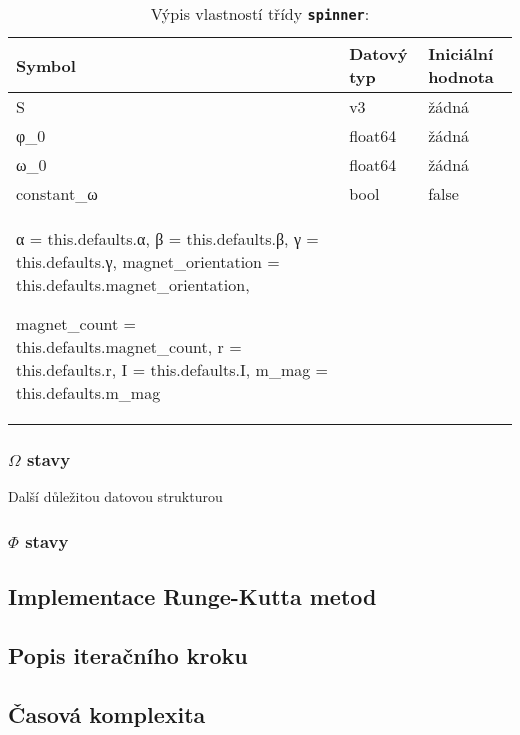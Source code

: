 \documentclass[12pt, a4paper,
 twoside,        %
 openright
]{report}
\begin{document}
\begin{table}[!ht]
    \captionsetup{justification=raggedright,singlelinecheck=off}
    \caption[Výpis vlastností třídy \textbf{\texttt{spinner}}]{Výpis vlastností třídy \textbf{\texttt{spinner}}:}
    \label{tab:sim_spinner_properties}

    \begin{tabularx}{\textwidth}{p{} p{} p{}}
        \textbf{Symbol} & \textbf{Datový typ} & \textbf{Iniciální hodnota}                    \\
        \hline
        S & v3 & žádná \\
        φ_0 & float64 & žádná \\
        ω_0 & float64 & žádná \\
    
        constant_ω & bool & false \\
        α = this.defaults.α,
        β = this.defaults.β,
        γ = this.defaults.γ,
        magnet_orientation = this.defaults.magnet_orientation,
    
        magnet_count = this.defaults.magnet_count,
        r = this.defaults.r,
        I = this.defaults.I,
        m_mag = this.defaults.m_mag
    \end{tabularx}
\end{table}


\subsubsection{$\Omega$ stavy}

Další důležitou datovou strukturou

\subsubsection{$\varPhi$ stavy}


\subsection{Implementace Runge-Kutta metod}

\subsection{Popis iteračního kroku}

\subsection{Časová komplexita}
\end{document}
